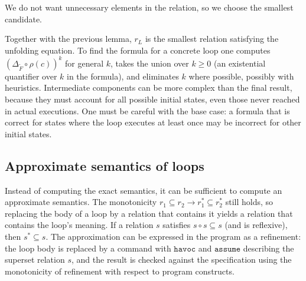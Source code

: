 We do not want unnecessary elements in the relation, so we choose the smallest candidate.
 
 
 
 
Together with the previous lemma, $r_L$ is the smallest relation satisfying the unfolding equation. To find the formula for a concrete loop one computes $(\Delta_{\tilde F} \circ \rho(c))^k$ for general $k$, takes the union over $k \ge 0$ (an existential quantifier over $k$ in the formula), and eliminates $k$ where possible, possibly with heuristics. Intermediate components can be more complex than the final result, because they must account for all possible initial states, even those never reached in actual executions. One must be careful with the base case: a formula that is correct for states where the loop executes at least once may be incorrect for other initial states.
 
\subsection*{Approximate semantics of loops}
 
Instead of computing the exact semantics, it can be sufficient to compute an approximate semantics. The monotonicity $r_1 \subseteq r_2 \rightarrow r_1^* \subseteq r_2^*$ still holds, so replacing the body of a loop by a relation that contains it yields a relation that contains the loop's meaning. If a relation $s$ satisfies $s \circ s \subseteq s$ (and is reflexive), then $s^* \subseteq s$. The approximation can be expressed in the program as a refinement: the loop body is replaced by a command with $\texttt{havoc}$ and $\texttt{assume}$ describing the superset relation $s$, and the result is checked against the specification using the monotonicity of refinement with respect to program constructs.
 
% 

